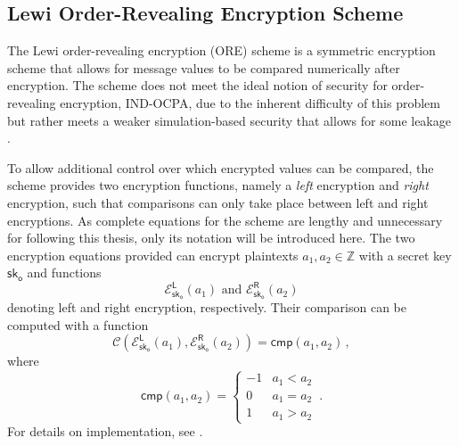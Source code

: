 % 
% 

\subsection{Lewi Order-Revealing Encryption Scheme}\label{subsec:prelims:lewi_ore}
The Lewi order-revealing encryption (ORE) scheme is a symmetric encryption scheme that allows for message values to be compared numerically after encryption. The scheme does not meet the ideal notion of security for order-revealing encryption, IND-OCPA, due to the inherent difficulty of this problem but rather meets a weaker simulation-based security that allows for some leakage \cite{chenettePracticalOrderRevealingEncryption2016}.

To allow additional control over which encrypted values can be compared, the scheme provides two encryption functions, namely a \textit{left} encryption and \textit{right} encryption, such that comparisons can only take place between left and right encryptions. As complete equations for the scheme are lengthy and unnecessary for following this thesis, only its notation will be introduced here. The two encryption equations provided can encrypt plaintexts $a_1,a_2\in\mathbb{Z}$ with a secret key $\mathsf{sk}_{\mathsf{o}}$ and functions
\begin{equation}\label{eq:prelims:lewi_enc}
    \mathcal{E}^{\mathsf{L}}_{\mathsf{sk}_{\mathsf{o}}}\left(a_1\right)\text{ and }\mathcal{E}^{\mathsf{R}}_{\mathsf{sk}_{\mathsf{o}}}\left(a_2\right)
\end{equation}
denoting left and right encryption, respectively. Their comparison can be computed with a function
\begin{equation}\label{eq:prelims:lewi_comp}
    \mathcal{C}\left(\mathcal{E}^{\mathsf{L}}_{\mathsf{sk}_{\mathsf{o}}}(a_1), \mathcal{E}^{\mathsf{R}}_{\mathsf{sk}_{\mathsf{o}}}(a_2)\right) = \mathsf{cmp}(a_1, a_2)\,,
\end{equation}
where
\begin{equation*}
    \mathsf{cmp}(a_1, a_2)=
    \begin{cases}
        -1 & a_1 < a_2\\
        0 & a_1 = a_2\\
        1 & a_1 > a_2
    \end{cases}\,.
\end{equation*}
For details on implementation, see \cite{lewiOrderRevealingEncryptionNew2016}.


